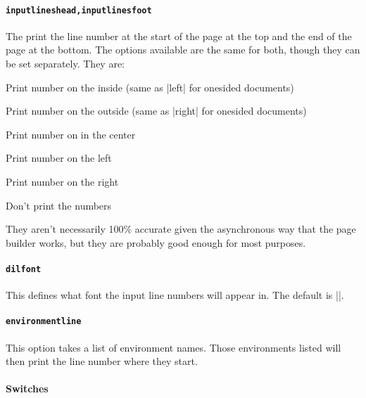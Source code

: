 \documentclass{scrartcl}
\begin{document}
\paragraph{\lstinline+inputlineshead,inputlinesfoot+}

The print the line number at the start of the page at the top and the
end of the page at the bottom.
The options available are the same for both, though they can be set separately. 
They are:
\begin{description}[labelindent=1cm]
\item[inside] Print number on the inside (same as |left| for onesided
  documents)
\item[outside] Print number on the outside (same as |right| for
  onesided documents)
\item[center] Print number on in the center
\item[left] Print number on the left
\item[right] Print number on the right
\item[off] Don't print the numbers
\end{description}

They aren't necessarily 100\% accurate given the asynchronous way that
the page builder works, but they are probably good enough for most purposes.

\paragraph{\lstinline+dilfont+}

This defines what font the input line numbers will appear in.
The default is |\ttfamily|.

\paragraph{\lstinline+environmentline+}

This option takes a list of environment names.
Those environments listed will then print the line number where they
start.

\paragraph{Switches}
\end{document}
